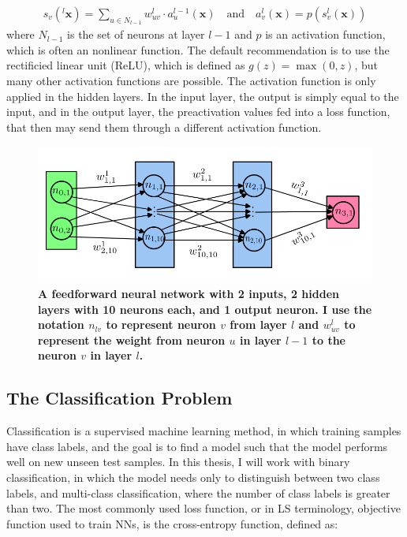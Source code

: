 \begin{align*}
    s_{v}(^l \mathbf{x}) = \sum _{u \in N_{l-1}} w_{uv}^l \cdot a_{u}^{l-1}(\mathbf{x})
    \quad 
    \text{and}
    \quad 
    a_{v}^l(\mathbf{x}) = p(s_{v}^l(\mathbf{x}))
\end{align*}
where $N_{l-1}$ is the set of neurons at layer $l-1$ and $p$ is an activation function, which is often an nonlinear function. The default recommendation is to use the rectificied linear unit (ReLU), which is defined as $g(z) = \max(0, z)$, but many other activation functions are possible. The activation function is only applied in the hidden layers. In the input layer, the output is simply equal to the input, and in the output layer, the preactivation values fed into a loss function, that then may send them through a different activation function. 
\begin{figure}[H]
    \centering
    \includegraphics[width=1\linewidth]{Figures/neural_network.png}
    \caption{\small{\textbf{A feedforward neural network with 2 inputs, 2 hidden layers with 10 neurons each, and 1 output neuron. I use the notation $n_{lv}$ to represent neuron $v$ from layer $l$ and $w^l_{uv}$ to represent the weight from neuron $u$ in layer $l-1$ to the neuron $v$ in layer $l$.}}}
    \label{nn}
\end{figure}

\subsection{The Classification Problem}
Classification is a supervised machine learning method, in which training samples have class labels, and the goal is to find a model such that the model performs well on new unseen test samples. In this thesis, I will work with binary classification, in which the model needs only to distinguish between two class labels, and multi-class classification, where the number of class labels is greater than two. The most commonly used loss function, or in LS terminology, objective function used to train NNs, is the cross-entropy function, defined as:

